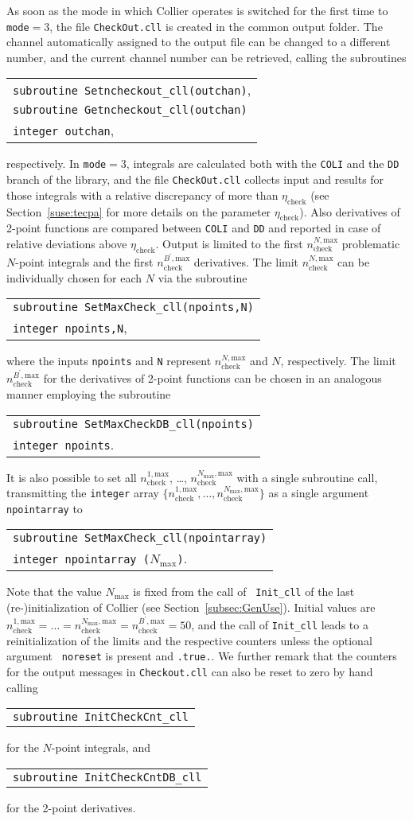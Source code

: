 \documentclass[preprint,sort&compress,12pt]{elsarticle}
\makeatletter
\def\bce{\begin{center}}
\def\ece{\end{center}}
\def\refse#1{\mbox{Section~\ref{#1}}}
\newcommand{\collier}{{\sc Collier}}
\newlength{\parwidth}\newlength{\colonewidth}%
\newcommand{\cpcsub}[1]
{%
\setlength{\parwidth}{\textwidth}\addtolength{\parwidth}{-2.1em}%
\bce
\begin{tabular}[t]{@{}p{\parwidth}@{}}
#1
\end{tabular}
\ece
}%
\makeatother
\begin{document}
As soon as the mode in which {\collier} operates is switched for the
first time to {\tt mode${=}3$}, the file {\tt CheckOut.cll} is created
in the common output folder. The channel automatically assigned to the
output file can be changed to a different number, and the current
channel number can be retrieved, calling the subroutines
\cpcsub{
{\tt subroutine  Setncheckout\_cll(outchan)}\;,\\
{\tt subroutine  Getncheckout\_cll(outchan)}\\
{\tt integer outchan}\;, \\
}
respectively. In {\tt mode${=}3$}, integrals are calculated both with
the {\tt COLI} and the {\tt DD} branch of the library, and the file
{\tt CheckOut.cll} collects input and results for those integrals with
a relative discrepancy of more than $\eta_\textrm{check}$ (see
\refse{suse:tecpa} for more details on the parameter
$\eta_\textrm{check}$). Also derivatives of 2-point functions are
compared between {\tt COLI} and {\tt DD} and reported in case of
relative deviations above $\eta_\textrm{check}$.  Output is limited to
the first $n^{N,\textrm{max}}_\textrm{check}$ problematic $N$-point
integrals and the first $n^{B^\prime,\textrm{max}}_\textrm{check}$
derivatives.  The limit $n^{N,\textrm{max}}_\textrm{check}$ can be
individually chosen for each $N$ via the subroutine
\cpcsub{
{\tt subroutine  SetMaxCheck\_cll(npoints,N)}\\
{\tt integer npoints,N}\;, \\
}
where the 
inputs {\tt npoints} and {\tt N} represent $n^{N,\textrm{max}}_\textrm{check}$ and $N$, respectively. The limit
$n^{B^\prime,\textrm{max}}_\textrm{check}$ for the derivatives of 2-point functions can be chosen in an analogous manner employing the subroutine
\cpcsub{
{\tt subroutine  SetMaxCheckDB\_cll(npoints)}\\
{\tt integer npoints}\;. \\
}
It is also possible to set all $n^{1,\textrm{max}}_\textrm{check}$, \ldots, $n^{N_{\textrm{max}},\textrm{max}}_\textrm{check}$ 
with a single subroutine call,
transmitting the {\tt integer} array $\{n^{1,\textrm{max}}_\textrm{check},\ldots,n^{N_{\textrm{max}},\textrm{max}}_\textrm{check}\}$
as a single argument {\tt npointarray} to
\cpcsub{
{\tt subroutine  SetMaxCheck\_cll(npointarray)}\\
{\tt integer npointarray ($N_\textrm{max}$)}\;. \\
}
Note that the value $N_{\textrm{max}}$ is fixed from the call of {\tt
  Init\_cll} of the last \mbox{(re-)}initialization of {\collier} (see
\refse{subsec:GenUse}).  Initial values are
$n^{1,\textrm{max}}_\textrm{check}=\ldots=n^{N_{\textrm{max}},\textrm{max}}_\textrm{check}=n^{B^\prime,\textrm{max}}_\textrm{check}=50$,
and the call of {\tt Init\_cll} leads to a reinitialization of the
limits and the respective counters unless the optional argument {\tt
  noreset} is present and {\tt .true.}. We further remark that the
counters for the output messages in {\tt Checkout.cll} can also be
reset to zero by hand calling
\cpcsub{
{\tt subroutine  InitCheckCnt\_cll}
}
for the $N$-point integrals, and 
\cpcsub{
{\tt subroutine  InitCheckCntDB\_cll}
}
for the 2-point derivatives.
\end{document}

